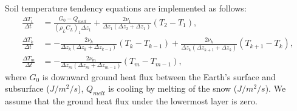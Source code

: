 Soil temperature tendency equations are implemented as follows:
\begin{align}
  \frac{\Delta T_{1}}{\Delta t} &=   \frac{G_{0} - Q_{melt}}{(\rho_{L}C_{L})_{1}\Delta z_{1}} + \frac{2\nu_{1}}{\Delta z_{1}(\Delta z_{2}+\Delta z_{1})} (T_{2}-T_{1}), \\
  \frac{\Delta T_{k}}{\Delta t} &= - \frac{2\nu_{k}}{\Delta z_{k}(\Delta z_{k}+\Delta z_{k-1})} (T_{k}-T_{k-1}) + \frac{2\nu_{k}}{\Delta z_{k}(\Delta z_{k+1}+\Delta z_{k})} (T_{k+1}-T_{k}), \\
  \frac{\Delta T_{m}}{\Delta t} &= - \frac{2\nu_{m}}{\Delta z_{m}(\Delta z_{m}+\Delta z_{m-1})} (T_{m}-T_{m-1}),
\end{align}
where $G_{0}$ is downward ground heat flux between the Earth's surface and subsurface ($J/m^2/s$),
$Q_{melt}$ is cooling by melting of the snow ($J/m^2/s$).
We assume that the ground heat flux under the lowermost layer is zero.

